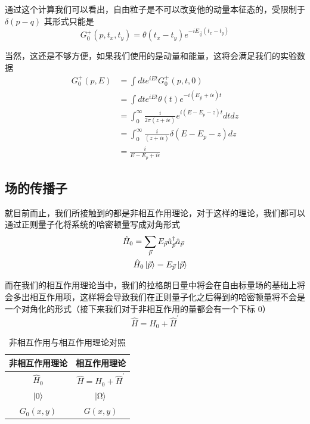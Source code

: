 \documentclass{article}
\begin{document}
通过这个计算我们可以看出，自由粒子是不可以改变他的动量本征态的，受限制于 $\delta(p - q)$ 其形式只能是
\begin{equation*}
    G^{+}_0(p,t_x,t_y) = \theta(t_x - t_y)e^{-iE_{\vec{q}}(t_x - t_y)}
\end{equation*}

当然，这还是不够方便，如果我们使用的是动量和能量，这将会满足我们的实验数据
\begin{align*}
    G_0^{+}(p,E) &= \int dt e^{iEt}G_0^{+}(p,t,0) \\
    &= \int dt e^{iEt}\theta(t)e^{-i(E_{\vec{p}} + i\epsilon) t} \\
    &= \int_{0}^{\infty} \frac{i}{2\pi(z + i\epsilon)} e^{i(E - E_p -z)t}dt dz\\
    &= \int_{0}^{\infty} \frac{i}{(z + i\epsilon)} \delta(E - E_p -z) dz\\
    &= \frac{i}{E - E_p + i\epsilon}
\end{align*}





\subsection{场的传播子}

就目前而止，我们所接触到的都是非相互作用理论，对于这样的理论，我们都可以通过正则量子化将系统的哈密顿量写成对角形式
\begin{align*}
    \hat{H}_0 &= \sum_{\vec{p}}E_{\vec{p}}\hat{a}_{\vec{p}}^\dagger\hat{a}_{\vec{p}} \\
    &\hat{H}_0\ket{\vec{p}} = E_{\vec{p}}\ket{\vec{p}} 
\end{align*}

而在我们的相互作用理论当中，我们的拉格朗日量中将会在自由标量场的基础上将会多出相互作用项，这样将会导致我们在正则量子化之后得到的哈密顿量将不会是一个对角化的形式（接下来我们对于非相互作用的量都会有一个下标 $0$）
\begin{equation*}
    \hat{H} = \hat{H}_0 + \hat{H}^\prime
\end{equation*}

\begin{table}[hbpt]
    \centering
    \caption{非相互作用与相互作用理论对照}
    \begin{tabular*}{0.8\textwidth}{cc}
        \hline
        非相互作用理论 & 相互作用理论 \\
        \hline
        $\hat{H}_0$ & $\hat{H} = \hat{H}_0 + \hat{H}^\prime$ \\
        \hline 
        $\ket{0}$ & $\ket{\Omega}$ \\
        \hline
        $G_0(x,y)$ & $G(x,y)$ \\
        \hline
    \end{tabular*}
\end{table}
\end{document}
